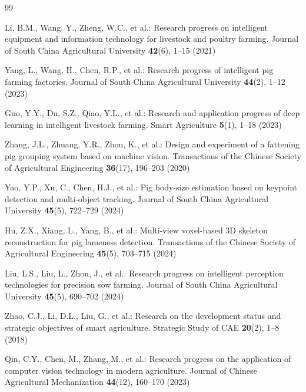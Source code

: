\documentclass[runningheads]{llncs}
\begin{document}
%
%
%
% 
% 
%
\begin{thebibliography}{99}

Li, B.M., Wang, Y., Zheng, W.C., et al.: Research progress on intelligent equipment and information technology for livestock and poultry farming. Journal of South China Agricultural University \textbf{42}(6), 1--15 (2021)

Yang, L., Wang, H., Chen, R.P., et al.: Research progress of intelligent pig farming factories. Journal of South China Agricultural University \textbf{44}(2), 1--12 (2023)

Guo, Y.Y., Du, S.Z., Qiao, Y.L., et al.: Research and application progress of deep learning in intelligent livestock farming. Smart Agriculture \textbf{5}(1), 1--18 (2023)

Zhang, J.L., Zhuang, Y.R., Zhou, K., et al.: Design and experiment of a fattening pig grouping system based on machine vision. Transactions of the Chinese Society of Agricultural Engineering \textbf{36}(17), 196--203 (2020)

Yao, Y.P., Xu, C., Chen, H.J., et al.: Pig body-size estimation based on keypoint detection and multi-object tracking. Journal of South China Agricultural University \textbf{45}(5), 722--729 (2024)

Hu, Z.X., Xiang, L., Yang, B., et al.: Multi-view voxel-based 3D skeleton reconstruction for pig lameness detection. Transactions of the Chinese Society of Agricultural Engineering \textbf{45}(5), 703--715 (2024)

Liu, L.S., Liu, L., Zhou, J., et al.: Research progress on intelligent perception technologies for precision sow farming. Journal of South China Agricultural University \textbf{45}(5), 690--702 (2024)

Zhao, C.J., Li, D.L., Liu, G., et al.: Research on the development status and strategic objectives of smart agriculture. Strategic Study of CAE \textbf{20}(2), 1--8 (2018)

Qin, C.Y., Chen, M., Zhang, M., et al.: Research progress on the application of computer vision technology in modern agriculture. Journal of Chinese Agricultural Mechanization \textbf{44}(12), 160--170 (2023)


\end{thebibliography}
\end{document}
